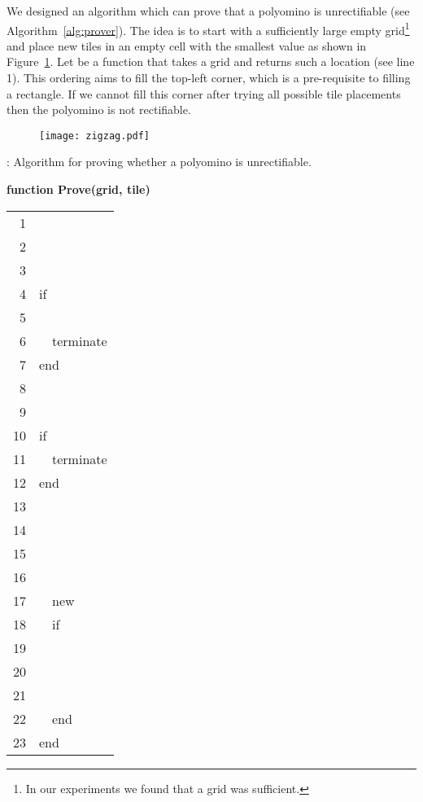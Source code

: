 \documentclass[10pt,a4paper]{article}
\theoremstyle{definition}
\begin{document}
We designed an algorithm which can prove that a polyomino is unrectifiable (see Algorithm~\ref{alg:prover}).
The idea is to start with a sufficiently large empty grid\footnote{In our experiments we found that a  grid was sufficient.}
and place new tiles in an empty cell with the smallest value as shown in Figure~\ref{fig:zigzag}. Let 
be a function that takes a grid and returns such a location (see line 1).
This ordering aims to fill the top-left corner, which is a pre-requisite to filling a rectangle.
If we cannot fill this corner after trying all possible tile
placements then the polyomino is not rectifiable.


\begin{figure}[!htpb]
\centering
\texttt{[image: zigzag.pdf]}
\caption{}
\label{fig:zigzag}
\end{figure}


\begin{algorithm}[!htpb]
\renewcommand{\arraystretch}{1.15}
\caption{: Algorithm for proving whether a polyomino is unrectifiable.}
\vspace{0.5ex}
\bf function Prove(grid, tile) \\
\begin{tabular}{rl}
\\
1 &  \\
2 & \\
3 &  \\
4 & if  \\
5 & ~~ \\
6 & ~~terminate \\
7 & end \\
8 & \\
9 &  \\
10 & if  \\
11 & ~~terminate \\
12 & end \\
13 & \\
14 &  \\
15 &  \\
16 & ~~\footnotemark  \\
17 & ~~new  \\
18 & ~~if  \\
19 & ~~~~ \\
20 & ~~~~ ~~~~\\
21 & ~~~~ \\
22 & ~~end \\
23 & end \\
\end{tabular}
\label{alg:prover}
\end{algorithm}
\end{document}
